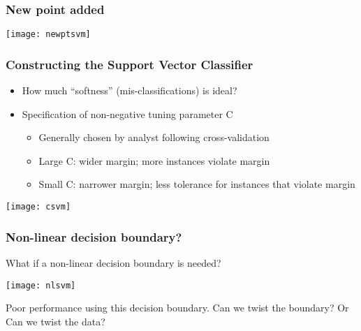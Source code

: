 \begin{frame}[fragile]\frametitle{New point added }
\begin{center}
\texttt{[image: newptsvm]}
\end{center}
\end{frame}




\begin{frame}[fragile]\frametitle{Constructing the Support Vector Classifier }
\begin{itemize}
\item How much ``softness'' (mis-classifications) is ideal?
\item Specification of non-negative tuning parameter C
\begin{itemize}
\item Generally chosen by analyst following cross-validation
\item Large C: wider margin; more instances violate margin
\item Small C: narrower margin; less tolerance for instances that violate margin
\end{itemize}
\end{itemize}
\begin{center}
\texttt{[image: csvm]}
\end{center}
\end{frame}


\begin{frame}[fragile]\frametitle{Non-linear decision boundary?}
What if a non-linear decision boundary is needed?
\begin{center}
\texttt{[image: nlsvm]}
\end{center}
Poor performance using this decision boundary.
Can we twist the boundary? Or
Can we twist the data?
\end{frame}

